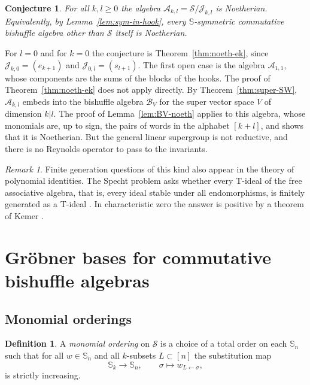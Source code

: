 \documentclass[11pt]{amsart}
\newtheorem{conjecture}[theorem]{Conjecture}
\theoremstyle{definition}
\newtheorem{definition}[theorem]{Definition}
\theoremstyle{remark}
\newtheorem{remark}[theorem]{Remark}
\newcommand{\bS}{\mathbb{S}}
\newcommand{\cA}{\mathscr{A}}
\newcommand{\cB}{\mathcal{B}}
\newcommand{\cJ}{\mathscr{J}}
\newcommand{\cS}{\mathscr{S}}
\begin{document}
\begin{conjecture}\label{conj:noeth-hooks}
For all $k,l\ge0$ the algebra $\cA_{k,l}=\cS/\cJ_{k,l}$ is Noetherian. Equivalently, by Lemma~\ref{lem:sym-in-hook}, every $\bS$-symmetric commutative bishuffle algebra other than $\cS$ itself is Noetherian.
\end{conjecture}

For $l=0$ and for $k=0$ the conjecture is Theorem~\ref{thm:noeth-ek}, since $\cJ_{k,0}=(e_{k+1})$ and $\cJ_{0,l}=(s_{l+1})$. The first open case is the algebra $\cA_{1,1}$, whose components are the sums of the blocks of the hooks. The proof of Theorem~\ref{thm:noeth-ek} does not apply directly. By Theorem~\ref{thm:super-SW}, $\cA_{k,l}$ embeds into the bishuffle algebra $\cB_V$ for the super vector space $V$ of dimension $k|l$. The proof of Lemma~\ref{lem:BV-noeth} applies to this algebra, whose monomials are, up to sign, the pairs of words in the alphabet $[k+l]$, and shows that it is Noetherian. But the general linear supergroup is not reductive, and there is no Reynolds operator to pass to the invariants. 

\begin{remark}\label{rem:specht}
Finite generation questions of this kind also appear in the theory of polynomial identities. The Specht problem asks whether every T-ideal of the free associative algebra, that is, every ideal stable under all endomorphisms, is finitely generated as a T-ideal \cite{Specht}. In characteristic zero the answer is positive by a theorem of Kemer \cite{Kemer87,Kemer91}.
\end{remark}

\section{Gr\"obner bases for commutative bishuffle algebras}\label{sec:GB}

\subsection{Monomial orderings}

\begin{definition}
A \emph{monomial ordering} on $\cS$ is a choice of a total order on each $\bS_n$ such that for all $w\in\bS_n$ and all $k$-subsets $L\subset[n]$ the substitution map
\[
\bS_k\to\bS_n,\qquad \sigma\mapsto w_{L\leftarrow\sigma},
\]
is strictly increasing.
\end{definition}
\end{document}
